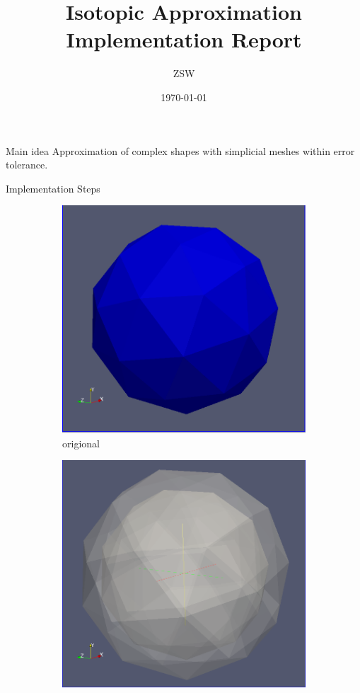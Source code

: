 \documentclass{beamer}
\title[Isotopic Approximation]{Isotopic Approximation Implementation Report} %
\author{ZSW} %
\institute[ZJU] %
{
ZJU\\ %
\medskip
}
\date{\today} %
\begin{document}
\begin{frame}
\titlepage %
\end{frame}

\begin{frame}
  \begin{block}{Main idea}
    Approximation of complex shapes with simplicial meshes  within error tolerance.
   \end{block}
\end{frame}

\begin{frame} {Implementation Steps}
  \begin{figure}[h]
    \begin{subfigure}[b]{0.23\textwidth}
      \includegraphics[width=\textwidth]{ori}
      \caption[1]{origional}
    \end{subfigure}
    \begin{subfigure}[b]{0.23\textwidth}
      \includegraphics[width=\textwidth]{tol}

\end{subfigure}
\end{figure}
\end{frame}
\end{document}
